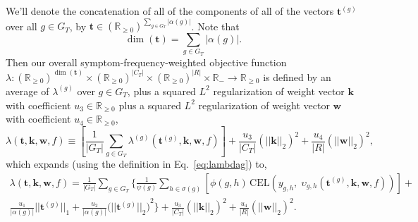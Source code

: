 \documentclass[11pt,notitlepage,english]{article}
\begin{document}
We'll denote the concatenation of all of the components of all of
the vectors ${\boldsymbol t}^{(g)}$ over all $g \in G_T$, by
$\boldsymbol{t} \in {({\mathbb R}_{\geq 0})}^{\sum_{g \in G_T} |\alpha(g)|}$. Note that
\begin{equation}
\dim({\boldsymbol t}) = \sum_{g \in G_T} |\alpha(g)|.
\end{equation}
Then our overall symptom-frequency-weighted objective function
$\lambda: {({\mathbb R}_{\geq 0})}^{\dim({\boldsymbol t})} \times {({\mathbb R}_{\geq 0})}^{|C_T|} \times {({\mathbb R}_{\geq   0})}^{|R|} \times {\mathbb R}_{-} \rightarrow {\mathbb R}_{\geq 0}$
 is defined by an average of
 $\lambda^{(g)}$ over $g \in G_T$, plus a squared $L^2$ regularization
 of weight vector ${\boldsymbol k}$ with coefficient $u_3 \in {\mathbb R}_{\geq 0}$
 plus a squared $L^2$ regularization of
weight vector ${\boldsymbol w}$ with coefficient $u_4 \in {\mathbb R}_{\geq 0}$,
\begin{equation}
 \lambda({\boldsymbol t}, {\boldsymbol k}, {\boldsymbol w}, f) \equiv \left[\frac{1}{|G_T|}
  \sum\limits_{g \in G_T} \lambda^{(g)}({\boldsymbol t}^{(g)}, {\boldsymbol k}, {\boldsymbol w}, f)\right] +  
  \frac{u_3}{|C_T|} {(||{\boldsymbol k}||_2)}^2 +
  \frac{u_4}{|R|} {(||{\boldsymbol w}||_2)}^2,
\end{equation}
which expands (using the definition in Eq.~\ref{eq:lambdag}) to,
\begin{multline}
  \lambda({\boldsymbol t}, {\boldsymbol k}, {\boldsymbol w}, f) = \frac{1}{|G_T|}
  \sum\limits_{g \in G_T}  \Biggl\{ \frac{1}{\psi(g)}
  \sum\limits_{h \in \sigma(g)}
  \left[ \phi(g, h)\, \textrm{CEL}\!\left(y_{g,h}, \; \upsilon_{g,h}({\boldsymbol
      t}^{(g)},{\boldsymbol k},{\boldsymbol w},f)\right) \right] + \\
  \frac{u_1}{|\alpha(g)|} ||{\boldsymbol
    t}^{(g)}||_1
  + \frac{u_2}{|\alpha(g)|} {\bigl(||{\boldsymbol t}^{(g)}||_2\bigr)}^2 \Biggr\} +
  \frac{u_3}{|C_T|} {(||{\boldsymbol k}||_2)}^2 +
  \frac{u_4}{|R|} {(||{\boldsymbol w}||_2)}^2.
\end{multline}
\end{document}
